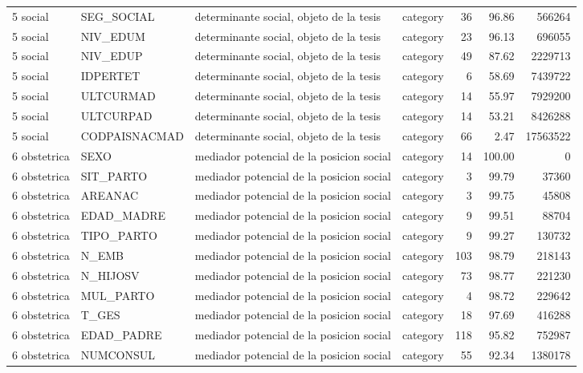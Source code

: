 \begin{tabular}{llllrrr}
5 social & SEG\_SOCIAL & determinante social, objeto de la tesis & category & 36 & 96.86 & 566264 \\
5 social & NIV\_EDUM & determinante social, objeto de la tesis & category & 23 & 96.13 & 696055 \\
5 social & NIV\_EDUP & determinante social, objeto de la tesis & category & 49 & 87.62 & 2229713 \\
5 social & IDPERTET & determinante social, objeto de la tesis & category & 6 & 58.69 & 7439722 \\
5 social & ULTCURMAD & determinante social, objeto de la tesis & category & 14 & 55.97 & 7929200 \\
5 social & ULTCURPAD & determinante social, objeto de la tesis & category & 14 & 53.21 & 8426288 \\
5 social & CODPAISNACMAD & determinante social, objeto de la tesis & category & 66 & 2.47 & 17563522 \\
6 obstetrica & SEXO & mediador potencial de la posicion social & category & 14 & 100.00 & 0 \\
6 obstetrica & SIT\_PARTO & mediador potencial de la posicion social & category & 3 & 99.79 & 37360 \\
6 obstetrica & AREANAC & mediador potencial de la posicion social & category & 3 & 99.75 & 45808 \\
6 obstetrica & EDAD\_MADRE & mediador potencial de la posicion social & category & 9 & 99.51 & 88704 \\
6 obstetrica & TIPO\_PARTO & mediador potencial de la posicion social & category & 9 & 99.27 & 130732 \\
6 obstetrica & N\_EMB & mediador potencial de la posicion social & category & 103 & 98.79 & 218143 \\
6 obstetrica & N\_HIJOSV & mediador potencial de la posicion social & category & 73 & 98.77 & 221230 \\
6 obstetrica & MUL\_PARTO & mediador potencial de la posicion social & category & 4 & 98.72 & 229642 \\
6 obstetrica & T\_GES & mediador potencial de la posicion social & category & 18 & 97.69 & 416288 \\
6 obstetrica & EDAD\_PADRE & mediador potencial de la posicion social & category & 118 & 95.82 & 752987 \\
6 obstetrica & NUMCONSUL & mediador potencial de la posicion social & category & 55 & 92.34 & 1380178 \\
\bottomrule
\end{tabular}
